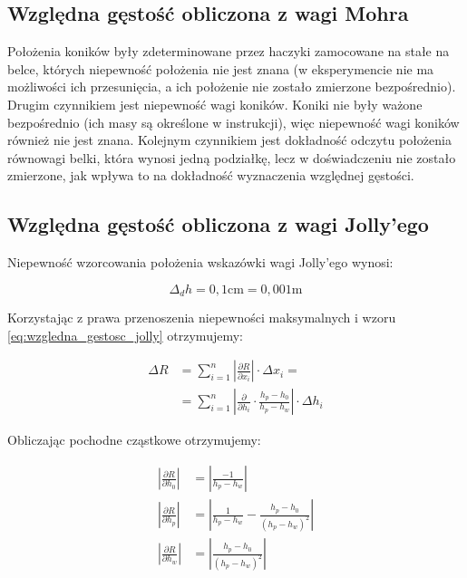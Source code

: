 \documentclass[a4paper,12pt]{article}
\begin{document}
\subsection{Względna gęstość obliczona z wagi Mohra}

Położenia koników były zdeterminowane przez haczyki zamocowane na stałe na belce, których niepewność położenia nie jest znana (w eksperymencie nie ma możliwości ich przesunięcia, a ich położenie nie zostało zmierzone bezpośrednio). Drugim czynnikiem jest niepewność wagi koników. Koniki nie były ważone bezpośrednio (ich masy są określone w instrukcji), więc niepewność wagi koników również nie jest znana. Kolejnym czynnikiem jest dokładność odczytu położenia równowagi belki, która wynosi jedną podziałkę, lecz w doświadczeniu nie zostało zmierzone, jak wpływa to na dokładność wyznaczenia względnej gęstości.

\subsection{Względna gęstość obliczona z wagi Jolly'ego}

Niepewność wzorcowania położenia wskazówki wagi Jolly'ego wynosi:

\begin{equation*}
    \Delta_d h = 0{,}1 \text{cm} = 0{,}001 \text{m}
\end{equation*}

Korzystając z prawa przenoszenia niepewności maksymalnych i wzoru \eqref{eq:wzgledna_gestosc_jolly} otrzymujemy:

\begin{align*}
    \Delta R & = \sum_{i=1}^{n} \left | \frac{\partial R}{\partial x_i} \right | \cdot \Delta x_i =                               \\
             & = \sum_{i=1}^{n} \left | \frac{\partial}{\partial h_i} \cdot \frac{h_p - h_0}{h_p - h_w} \right | \cdot \Delta h_i
\end{align*}

Obliczając pochodne cząstkowe otrzymujemy:

\begin{align*}
    \left | \frac{\partial R}{\partial h_0} \right | & = \left | \frac{-1}{h_p - h_w} \right |                                  \\
    \left | \frac{\partial R}{\partial h_p} \right | & = \left | \frac{1}{h_p - h_w} - \frac{h_p - h_0}{(h_p - h_w)^2} \right | \\
    \left | \frac{\partial R}{\partial h_w} \right | & = \left | \frac{h_p - h_0}{(h_p - h_w)^2} \right |
\end{align*}
\end{document}
